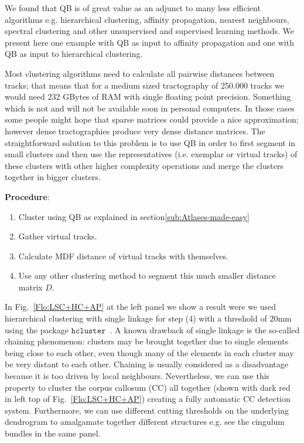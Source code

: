 \documentclass[preprint,authoryear,a4paper,10pt,onecolumn]{elsarticle}
\begin{document}
We found that QB is of great value as an adjunct to many less efficient
algorithms e.g. hierarchical clustering, affinity propagation, nearest
neighbours, spectral clustering and other unsupervised and supervised
learning methods. We present here one example with QB as input to
affinity propagation and one with QB as input to hierarchical
clustering.

Most clustering algorithms need to calculate all pairwise distances
between tracks; that means that for a medium sized tractography of
\num{250,000} tracks we would need $232$ GBytes of RAM with single floating
point precision. Something which is not and will not be available soon
in personal computers. In those cases some people might hope that sparse
matrices could provide a nice approximation; however dense
tractographies produce very dense distance matrices. The straightforward
solution to this problem is to use QB in order to first segment in small
clusters and then use the representatives (i.e. exemplar or virtual
tracks) of these clusters with other higher complexity operations and
merge the clusters together in bigger clusters.

\textbf{Procedure}:

\begin{enumerate}

\item Cluster using QB as explained in section\ref{sub:Atlases-made-easy}

\item Gather virtual tracks.

\item Calculate MDF distance of virtual tracks with themselves.

\item Use any other clustering method to segment this much smaller distance
matrix $D$.

\end{enumerate}

In Fig.~\ref{Flo:LSC+HC+AP} at the left panel we show a result were we
used hierarchical clustering with single linkage for step (4) with a
threshold of $20$mm using the package
$\texttt{hcluster}$~\citep{eads-hcluster-software}. A known drawback of
single linkage is the so-called chaining phenomenon: clusters may be
brought together due to single elements being close to each other, even
though many of the elements in each cluster may be very distant to each
other.  Chaining is usually considered as a disadvantage because it is
too driven by local neighbours. Nevertheless, we can use this property
to cluster the corpus callosum (CC) all together (shown with dark red in
left top of Fig.~\ref{Flo:LSC+HC+AP}) creating a fully automatic CC
detection system.  Furthermore, we can use different cutting thresholds
on the underlying dendrogram to amalgamate together different structures
e.g. see the cingulum bundles in the same panel.
\end{document}
